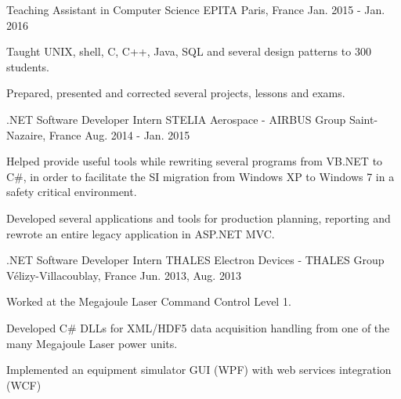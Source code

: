 \begin{cventries}
  \cventry
    {Teaching Assistant in Computer Science} %
    {EPITA} %
    {Paris, France} %
    {Jan. 2015 - Jan. 2016} %
    {
      \begin{cvitems} %
        \item {Taught UNIX, shell, C, C++, Java, SQL and several design patterns to 300 students.}
        \item {Prepared, presented and corrected several projects, lessons and exams.}
      \end{cvitems}
    }

  \cventry
    {.NET Software Developer Intern} %
    {STELIA Aerospace - AIRBUS Group} %
    {Saint-Nazaire, France} %
    {Aug. 2014 - Jan. 2015} %
    {
      \begin{cvitems} %
        \item {Helped provide useful tools while rewriting several programs from VB.NET to C\#, in order to facilitate the SI migration from Windows XP to Windows 7 in a safety critical environment.}
        \item {Developed several applications and tools for production planning, reporting and rewrote an entire legacy application in ASP.NET MVC.}
      \end{cvitems}
    }

  \cventry
    {.NET Software Developer Intern} %
    {THALES Electron Devices - THALES Group} %
    {Vélizy-Villacoublay, France} %
    {Jun. 2013, Aug. 2013} %
    {
      \begin{cvitems} %
        \item {Worked at the Megajoule Laser Command Control Level 1.}
        \item {Developed C\# DLLs for XML/HDF5 data acquisition handling from one of the many Megajoule Laser power units.}
        \item {Implemented an equipment simulator GUI (WPF) with web services integration (WCF)}
      \end{cvitems}
    }

\end{cventries}
